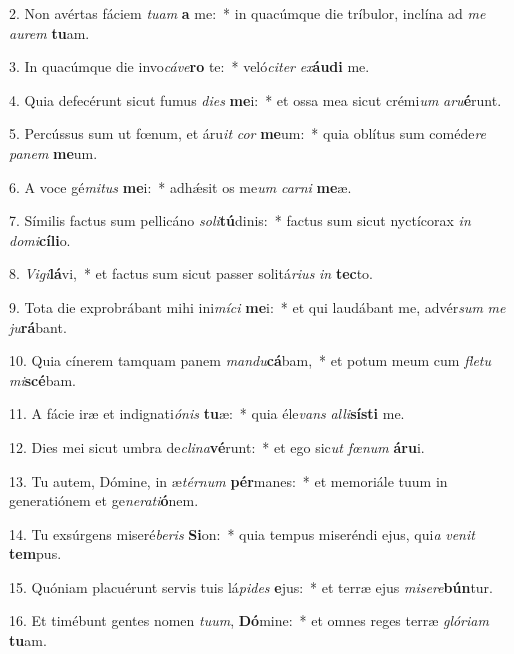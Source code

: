 2. Non avértas fáciem \textit{tu}\textit{am} \textbf{a} me:~*  in quacúmque die tríbulor, inclína ad \textit{me} \textit{au}\textit{rem} \textbf{tu}am.\

3. In quacúmque die invo\textit{cá}\textit{ve}\textbf{ro} te:~*  veló\textit{ci}\textit{ter} \textit{ex}\textbf{áu}\textbf{di} me.\

4. Quia defecérunt sicut fumus \textit{di}\textit{es} \textbf{me}i:~*  et ossa mea sicut crémi\textit{um} \textit{a}\textit{ru}\textbf{é}runt.\

5. Percússus sum ut fœnum, et áru\textit{it} \textit{cor} \textbf{me}um:~*  quia oblítus sum coméde\textit{re} \textit{pa}\textit{nem} \textbf{me}um.\

6. A voce gé\textit{mi}\textit{tus} \textbf{me}i:~*  adhǽsit os me\textit{um} \textit{car}\textit{ni} \textbf{me}æ.\

7. Símilis factus sum pellicáno \textit{so}\textit{li}\textbf{tú}dinis:~*  factus sum sicut nyctícorax \textit{in} \textit{do}\textit{mi}\textbf{cí}\textbf{li}o.\

8. \textit{Vi}\textit{gi}\textbf{lá}vi,~*  et factus sum sicut passer solitá\textit{ri}\textit{us} \textit{in} \textbf{tec}to.\

9. Tota die exprobrábant mihi ini\textit{mí}\textit{ci} \textbf{me}i:~*  et qui laudábant me, advér\textit{sum} \textit{me} \textit{ju}\textbf{rá}bant.\

10. Quia cínerem tamquam panem \textit{man}\textit{du}\textbf{cá}bam,~*  et potum meum cum \textit{fle}\textit{tu} \textit{mi}\textbf{scé}bam.\

11. A fácie iræ et indignati\textit{ó}\textit{nis} \textbf{tu}æ:~*  quia éle\textit{vans} \textit{al}\textit{li}\textbf{sís}\textbf{ti} me.\

12. Dies mei sicut umbra de\textit{cli}\textit{na}\textbf{vé}runt:~*  et ego sic\textit{ut} \textit{fœ}\textit{num} \textbf{á}\textbf{ru}i.\

13. Tu autem, Dómine, in æ\textit{tér}\textit{num} \textbf{pér}manes:~*  et memoriále tuum in generatiónem et ge\textit{ne}\textit{ra}\textit{ti}\textbf{ó}nem.\

14. Tu exsúrgens miseré\textit{be}\textit{ris} \textbf{Si}on:~*  quia tempus miseréndi ejus, qui\textit{a} \textit{ve}\textit{nit} \textbf{tem}pus.\

15. Quóniam placuérunt servis tuis lá\textit{pi}\textit{des} \textbf{e}jus:~*  et terræ ejus \textit{mi}\textit{se}\textit{re}\textbf{bún}tur.\

16. Et timébunt gentes nomen \textit{tu}\textit{um}, \textbf{Dó}mine:~*  et omnes reges terræ \textit{gló}\textit{ri}\textit{am} \textbf{tu}am.\

